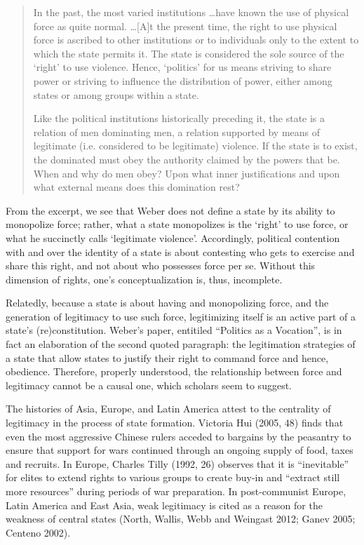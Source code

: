\documentclass [11pt]{article}
\begin{document}
\begin{quote}
\small
In the past, the most varied institutions \dots have known the use of physical force as quite normal. \dots [A]t the present time, the right to use physical force is ascribed to other institutions or to individuals only to the extent to which the state permits it. The state is considered the sole source of the `right' to use violence. Hence, `politics' for us means striving to share power or striving to influence the distribution of power, either among states or among groups within a state.

Like the political institutions historically preceding it, the state is a relation of men dominating men, a relation supported by means of legitimate (i.e. considered to be legitimate) violence. If the state is to exist, the dominated must obey the authority claimed by the powers that be. When and why do men obey? Upon what inner justifications and upon what external means does this domination rest?
\end{quote}

From the excerpt, we see that Weber does not define a state by its ability to monopolize force; rather, what a state monopolizes is the `right' to use force, or what he succinctly calls `legitimate violence'. Accordingly, political contention with and over the identity of a state is about contesting who gets to exercise and share this right, and not about who possesses force per se. Without this dimension of rights, one's conceptualization is, thus, incomplete.

Relatedly, because a state is about having and monopolizing force, and the generation of legitimacy to use such force, legitimizing itself is an active part of a state's (re)constitution. Weber's paper, entitiled ``Politics as a Vocation'', is in fact an elaboration of the second quoted paragraph: the legitimation strategies of a state that allow states to justify their right to command force and hence, obedience. Therefore, properly understood, the relationship between force and legitimacy cannot be a causal one, which scholars seem to suggest.

The histories of Asia, Europe, and Latin America attest to the centrality of legitimacy in the process of state formation. Victoria Hui (2005, 48) finds that even the most aggressive Chinese rulers acceded to bargains by the peasantry to ensure that support for wars continued through an ongoing supply of food, taxes and recruits. In Europe, Charles Tilly (1992, 26) observes that it is ``inevitable'' for elites to extend rights to various groups to create buy-in and ``extract still more resources'' during periods of war preparation. In post-communist Europe, Latin America and East Asia, weak legitimacy is cited as a reason for the weakness of central states (North, Wallis, Webb and Weingast 2012; Ganev 2005; Centeno 2002).
\end{document}
